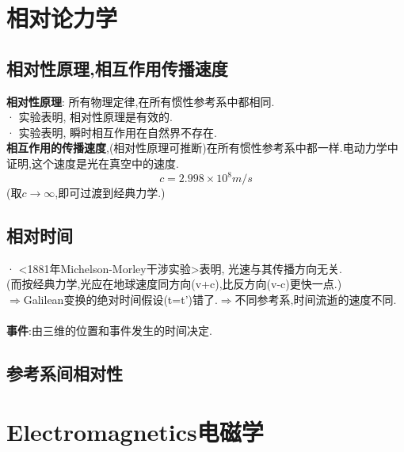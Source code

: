 \documentclass{article}
\begin{document}
\section{相对论力学}
\subsection{相对性原理,相互作用传播速度}
\textbf{相对性原理}: 所有物理定律,在所有惯性参考系中都相同.\\
· 实验表明, 相对性原理是有效的.\\
· 实验表明, 瞬时相互作用在自然界不存在.\\
\textbf{相互作用的传播速度},(相对性原理可推断)在所有惯性参考系中都一样.\quad 电动力学中证明,这个速度是光在真空中的速度.
\[c = 2.998 \times 10^8 m/s\]
(取$c\to \infty$,即可过渡到经典力学.)\\


\subsection{相对时间}
· <1881年Michelson-Morley干涉实验>表明, 光速与其传播方向无关.\\
(而按经典力学,光应在地球速度同方向(v+c),比反方向(v-c)更快一点.)\\
$\Rightarrow$Galilean变换的绝对时间假设(t=t')错了.\quad  $\Rightarrow$不同参考系,时间流逝的速度不同.\\
\\
\textbf{事件}:由三维的位置和事件发生的时间决定.


\subsection{参考系间相对性}



\section{Electromagnetics电磁学}
\end{document}
